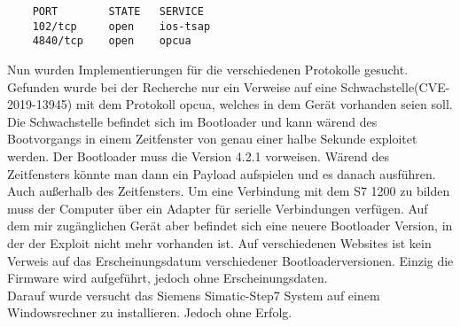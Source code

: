 \begin{verbatim}
	PORT 		STATE 	SERVICE
	102/tcp 	open	ios-tsap
	4840/tcp 	open	opcua
\end{verbatim}






\noindent Nun wurden Implementierungen für die verschiedenen Protokolle gesucht.
Gefunden wurde bei der Recherche nur ein Verweise auf eine Schwachstelle(CVE-2019-13945) mit dem Protokoll opcua, welches in dem Gerät vorhanden seien soll.
Die Schwachstelle befindet sich im Bootloader und kann wärend des Bootvorgangs in einem Zeitfenster von genau einer halbe Sekunde 
exploitet werden. Der Bootloader muss die Version 4.2.1 vorweisen. Wärend des Zeitfensters könnte man dann ein Payload aufspielen und es danach ausführen. 
Auch außerhalb des Zeitfensters. 
Um eine Verbindung mit dem S7 1200 zu bilden muss der Computer über ein Adapter für serielle Verbindungen verfügen.
Auf dem mir zugänglichen Gerät aber befindet sich eine neuere Bootloader Version, in der der Exploit nicht mehr vorhanden ist.
Auf verschiedenen Websites ist kein Verweis auf das Erscheinungsdatum verschiedener Bootloaderversionen. Einzig die Firmware wird aufgeführt, 
jedoch ohne Erscheinungsdaten.\\
Darauf wurde versucht das Siemens Simatic-Step7 System auf einem Windowsrechner zu installieren. 
Jedoch ohne Erfolg.


  
